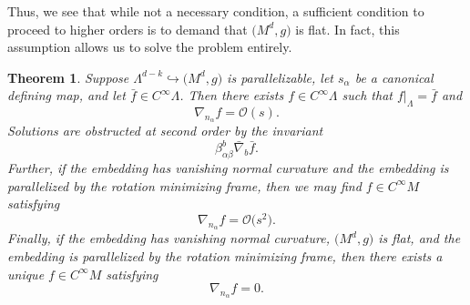\documentclass[10pt,a4paper]{article}
\numberwithin{equation}{section}
\newtheorem{Theorem}{Theorem}[section]
\renewcommand{\=}{\stackrel \Lambda =}
\begin{document}
Thus, we see that while not a necessary condition, a sufficient condition to proceed to higher orders is to demand that $\bigl(M^d,g\bigr)$ is flat. In fact, this assumption allows us to solve the problem entirely.
\begin{Theorem} \label{ho-extension}
Suppose $\Lambda^{d-k} \hookrightarrow \bigl(M^d,g\bigr)$ is parallelizable, let $s_{\alpha}$ be a canonical defining map, and let $\bar{f} \in C^\infty \Lambda$. Then there exists $f \in C^\infty \Lambda$ such that $f|_{\Lambda} = \bar{f}$ and
\[\nabla_{n_{\alpha}} f = \mathcal{O}(s) .\]
Solutions are obstructed at second order by the invariant
\[\beta^b_{\alpha \beta} \bar{\nabla}_b \bar{f} .\]
Further, if the embedding has vanishing normal curvature and the embedding is parallelized by the rotation minimizing frame, then we may find $f \in C^\infty M$ satisfying
\[\nabla_{n_{\alpha}} f = \mathcal{O}\bigl(s^2\bigr) .\]
Finally, if the embedding has vanishing normal curvature, $\bigl(M^d,g\bigr)$ is flat, and the embedding is parallelized by the rotation minimizing frame, then there exists a unique $f \in C^\infty M$ satisfying
\[\nabla_{n_{\alpha}} f = 0 .\]
\end{Theorem}
\end{document}
